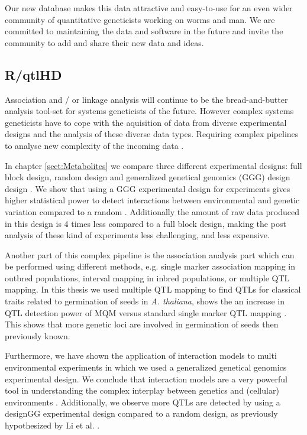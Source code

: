 Our new database makes this data attractive and easy-to-use for an even wider community of 
quantitative geneticists working on worms and man. We are committed to maintaining the data and 
software in the future and invite the community to add and share their new data and ideas. 

\subsection{R/qtlHD}
Association and / or linkage analysis will continue to be the bread-and-butter analysis 
tool-set for systems geneticists of the future. However complex systems geneticists have 
to cope with the aquisition of data from diverse experimental designs and the analysis of 
these diverse data types. Requiring complex pipelines to analyse new complexity of the 
incoming data \cite{Trelles:2011}.

In chapter \ref{sect:Metabolites} we compare three different experimental designs: full 
block design, random design and generalized genetical genomics (GGG) design design \cite{Joosen:2013, Li:2009}. We show 
that using a GGG experimental design for experiments gives higher statistical power to 
detect interactions between environmental and genetic variation compared to a random \cite{Joosen:2013}. 
Additionally the amount of raw data produced in this design is 4 times less compared to 
a full block design, making the post analysis of these kind of experiments less challenging, 
and less expensive.

Another part of this complex pipeline is the association analysis part which can be performed using 
different methods, e.g. single marker association mapping in outbred populations, interval 
mapping in inbred populations, or multiple QTL mapping. In this thesis we used multiple 
QTL mapping to find QTLs for classical traits related to germination of seeds in 
\emph{A. thaliana}, shows the an increase in QTL detection power of MQM versus standard 
single marker QTL mapping \cite{Jansen:1994a, Joosen:2011}. This shows that more genetic loci are involved in germination 
of seeds then previously known.

Furthermore, we have shown the application of interaction models to multi environmental 
experiments in which we used a generalized genetical genomics experimental design. We 
conclude that interaction models are a very powerful tool in understanding the complex 
interplay between genetics and (cellular) environments \cite{Joosen:2013}. Additionally, we observe more QTLs 
are detected by using a designGG experimental design compared to a random design, as previously hypothesized by Li et al. \cite{Li:2009}.


